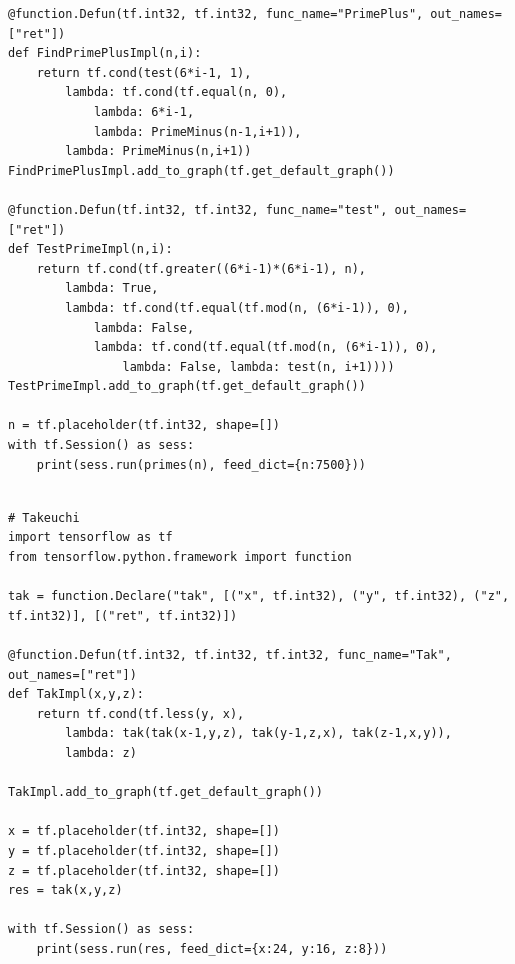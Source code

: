 \documentclass[ack,preface]{dithesis}
\begin{document}
\begin{appendix}
\begin{lstlisting}
@function.Defun(tf.int32, tf.int32, func_name="PrimePlus", out_names=["ret"])
def FindPrimePlusImpl(n,i):
	return tf.cond(test(6*i-1, 1),
		lambda: tf.cond(tf.equal(n, 0),
			lambda: 6*i-1,
			lambda: PrimeMinus(n-1,i+1)),
		lambda: PrimeMinus(n,i+1))
FindPrimePlusImpl.add_to_graph(tf.get_default_graph())

@function.Defun(tf.int32, tf.int32, func_name="test", out_names=["ret"])
def TestPrimeImpl(n,i):
	return tf.cond(tf.greater((6*i-1)*(6*i-1), n),
		lambda: True,
		lambda: tf.cond(tf.equal(tf.mod(n, (6*i-1)), 0),
			lambda: False,
			lambda: tf.cond(tf.equal(tf.mod(n, (6*i-1)), 0),
				lambda: False, lambda: test(n, i+1))))
TestPrimeImpl.add_to_graph(tf.get_default_graph())

n = tf.placeholder(tf.int32, shape=[])
with tf.Session() as sess:
	print(sess.run(primes(n), feed_dict={n:7500}))


\end{lstlisting}

\begin{lstlisting}
# Takeuchi
import tensorflow as tf
from tensorflow.python.framework import function

tak = function.Declare("tak", [("x", tf.int32), ("y", tf.int32), ("z", tf.int32)], [("ret", tf.int32)])

@function.Defun(tf.int32, tf.int32, tf.int32, func_name="Tak", out_names=["ret"])
def TakImpl(x,y,z):
	return tf.cond(tf.less(y, x),
        lambda: tak(tak(x-1,y,z), tak(y-1,z,x), tak(z-1,x,y)),
		lambda: z)

TakImpl.add_to_graph(tf.get_default_graph())

x = tf.placeholder(tf.int32, shape=[])
y = tf.placeholder(tf.int32, shape=[])
z = tf.placeholder(tf.int32, shape=[])
res = tak(x,y,z)

with tf.Session() as sess:
	print(sess.run(res, feed_dict={x:24, y:16, z:8}))
\end{lstlisting}


\end{appendix}


\end{document}
